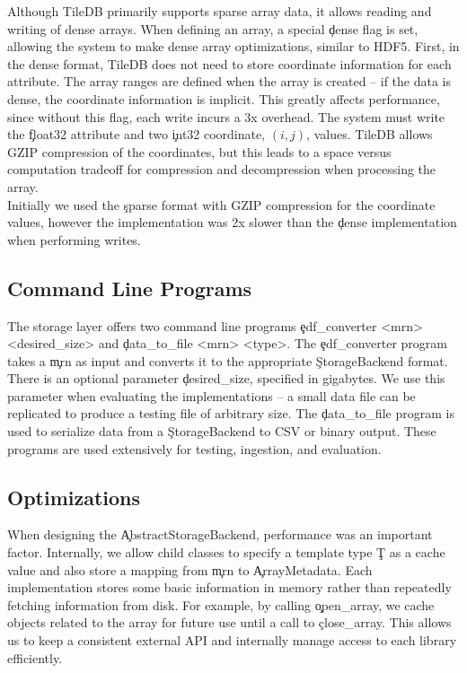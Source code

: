 Although TileDB primarily supports sparse array data, it allows reading and
writing of dense arrays. When defining an array, a special \c{dense} flag is
set, allowing the system to make dense array optimizations, similar to HDF5.
First, in the dense format, TileDB does not need to store coordinate
information for each attribute. The array ranges are defined when the array is
created -- if the data is dense, the coordinate information is implicit. This
greatly affects performance, since without this flag, each write incurs a 3x
overhead.  The system must write the \c{float32} attribute and two \c{int32}
coordinate, $(i,j)$, values. TileDB allows GZIP compression of the coordinates,
but this leads to a space versus computation tradeoff for compression and
decompression when processing the array. \\

Initially we used the \c{sparse} format with GZIP compression for the
coordinate values, however the implementation was 2x slower than the \c{dense}
implementation when performing writes.

\subsection{Command Line Programs}\label{storage-ch:implementation-cmd}

The storage layer offers two command line programs \c{edf\_converter <mrn>
  <desired\_size>} and \c{data\_to\_file <mrn> <type>}. The \c{edf\_converter}
program takes a \c{mrn} as input and converts it to the appropriate
\c{StorageBackend} format. There is an optional parameter \c{desired\_size},
specified in gigabytes. We use this parameter when evaluating the
implementations -- a small data file can be replicated to produce a testing
file of arbitrary size. The \c{data\_to\_file} program is used to serialize
data from a \c{StorageBackend} to CSV or binary output. These programs are used
extensively for testing, ingestion, and evaluation.

\subsection{Optimizations}\label{storage-ch:opt}

When designing the \c{AbstractStorageBackend}, performance was an important
factor. Internally, we allow child classes to specify a template type \c{T} as
a cache value and also store a mapping from \c{mrn} to \c{ArrayMetadata}. Each
implementation stores some basic information in memory rather than repeatedly
fetching information from disk.  For example, by calling \c{open\_array}, we
cache objects related to the array for future use until a call to
\c{close\_array}. This allows us to keep a consistent external API and
internally manage access to each library efficiently.

